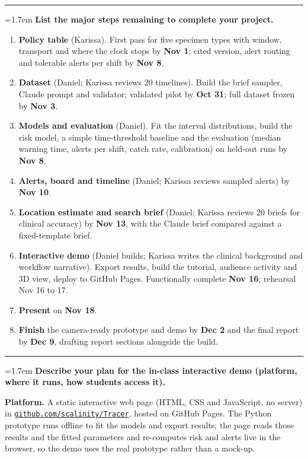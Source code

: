 \documentclass[10pt]{article}
\newcommand{\qa}[2]{%
  \par\Needspace{6\baselineskip}\addvspace{0.75em}%
  {\color{hair}\rule{\textwidth}{0.5pt}}\par\nopagebreak\vspace{0.15em}%
  \noindent\hangindent=1.7em\hangafter=1
  {\sffamily\bfseries\color{tracerteal}\makebox[1.7em][l]{#1}\color{black}#2}\par\nopagebreak\vspace{0.1em}}
\newcommand{\repo}{\href{https://github.com/scalinity/Tracer}{\nolinkurl{github.com/scalinity/Tracer}}}
\begin{document}
\qa{8.}{List the major steps remaining to complete your project.}
\begin{enumerate}[leftmargin=1.5em]
\item \textbf{Policy table} (Karissa). First pass for five specimen types with window, transport and where the
  clock stops by \textbf{Nov 1}; cited version, alert routing and tolerable alerts per shift by \textbf{Nov 8}.
\item \textbf{Dataset} (Daniel; Karissa reviews 20 timelines). Build the brief sampler, Claude prompt and validator;
  validated pilot by \textbf{Oct 31}; full dataset frozen by \textbf{Nov 3}.
\item \textbf{Models and evaluation} (Daniel). Fit the interval distributions, build the risk model, a simple
  time-threshold baseline and the evaluation (median warning time, alerts per shift, catch rate, calibration)
  on held-out runs by \textbf{Nov 8}.
\item \textbf{Alerts, board and timeline} (Daniel; Karissa reviews sampled alerts) by \textbf{Nov 10}.
\item \textbf{Location estimate and search brief} (Daniel; Karissa reviews 20 briefs for clinical accuracy)
  by \textbf{Nov 13}, with the Claude brief compared against a fixed-template brief.
\item \textbf{Interactive demo} (Daniel builds; Karissa writes the clinical background and workflow narrative).
  Export results, build the tutorial, audience activity and 3D view, deploy to GitHub Pages. Functionally complete
  \textbf{Nov 16}; rehearsal Nov 16 to 17.
\item \textbf{Present} on \textbf{Nov 18}.
\item \textbf{Finish} the camera-ready prototype and demo by \textbf{Dec 2} and the final report by \textbf{Dec 9},
  drafting report sections alongside the build.
\end{enumerate}

\qa{9.}{Describe your plan for the in-class interactive demo (platform, where it runs, how students access it).}
\textbf{Platform.} A static interactive web page (HTML, CSS and JavaScript, no server) in \repo, hosted on GitHub
Pages. The Python prototype runs offline to fit the models and export results; the page reads those results and
the fitted parameters and re-computes risk and alerts live in the browser, so the demo uses the real prototype
rather than a mock-up.
\end{document}
